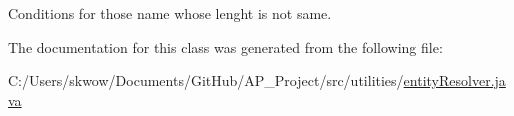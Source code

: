 Conditions for those name whose lenght is not same. 



The documentation for this class was generated from the following file\+:\begin{DoxyCompactItemize}
\item 
C\+:/\+Users/skwow/\+Documents/\+Git\+Hub/\+A\+P\+\_\+\+Project/src/utilities/\hyperlink{entity_resolver_8java}{entity\+Resolver.\+java}\end{DoxyCompactItemize}
